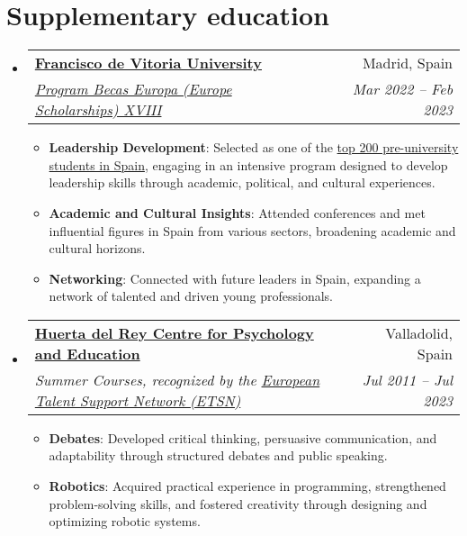 \documentclass[letterpaper,11pt]{article}
\makeatletter
\newcommand{\resumeItem}[2]{
  \item\small{
    \textbf{#1}{: #2 \vspace{-2pt}}
  }
}
\newcommand{\resumeSubheading}[4]{
  \vspace{-1pt}\item
    \begin{tabular*}{0.97\textwidth}[t]{l@{\extracolsep{\fill}}r}
      \textbf{#1} & #2 \\
      \textit{\small#3} & \textit{\small #4} \\
    \end{tabular*}\vspace{-5pt}
}
\newcommand{\resumeSubHeadingListStart}{\begin{itemize}[leftmargin=*]}
\newcommand{\resumeSubHeadingListEnd}{\end{itemize}}
\newcommand{\resumeItemListStart}{\begin{itemize}}
\newcommand{\resumeItemListEnd}{\end{itemize}\vspace{-5pt}}
\makeatother
\begin{document}
\section{Supplementary education}
  \resumeSubHeadingListStart

    \resumeSubheading
      {\href{https://www.ufv.es/en/}{Francisco de Vitoria University}}{Madrid, Spain}
      {\href{https://www.ufv.es/en/becas-europa-europe-scholarships/}
            {Program Becas Europa (Europe Scholarships) XVIII}}{Mar 2022 -- Feb 2023}
      \resumeItemListStart
        \resumeItem{Leadership Development}
          {Selected as one of the \href{https://becaseuropa.es/docs/BE18_Seleccionados3F.pdf}
          {top 200 pre-university students in Spain}, engaging in an intensive program designed
          to develop leadership skills through academic, political, and cultural experiences.}
        \resumeItem{Academic and Cultural Insights}
          {Attended conferences and met influential figures in Spain from various sectors,
          broadening academic and cultural horizons.}
        \resumeItem{Networking}
          {Connected with future leaders in Spain, expanding
            a network of talented and driven young professionals.}
      \resumeItemListEnd

    \resumeSubheading
      {\href{https://www.centrohuertadelrey.com/}
            {Huerta del Rey Centre for Psychology and Education}}{Valladolid, Spain}
            {Summer Courses, recognized by the \href{https://etsn.eu/}{European Talent Support Network (ETSN)}}
            {Jul 2011 -- Jul 2023}
      \resumeItemListStart
        \resumeItem {Debates}
          {Developed critical thinking, persuasive communication, and adaptability
          through structured debates and public speaking.}
        \resumeItem {Robotics}
        {Acquired practical experience in programming, strengthened problem-solving skills,
        and fostered creativity through designing and optimizing robotic systems.}
      \resumeItemListEnd

  \resumeSubHeadingListEnd


\end{document}

